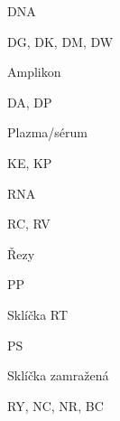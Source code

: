 \begin{appendix}
\begin{compactitem}
	\item DNA 
		\begin{compactitem}
			\item DG, DK, DM, DW
		\end{compactitem}

	\item Amplikon 
		\begin{compactitem}
			\item DA, DP
		\end{compactitem}

	\item Plazma/sérum 
		\begin{compactitem}
			\item KE, KP
		\end{compactitem}

	\item RNA 
		\begin{compactitem}
			\item RC, RV
		\end{compactitem}

	\item Řezy 
		\begin{compactitem}
			\item PP
		\end{compactitem}

	\item Sklíčka RT 
		\begin{compactitem}
			\item PS
		\end{compactitem}

	\item Sklíčka zamražená 
		\begin{compactitem}
			\item RY, NC, NR, BC
		\end{compactitem}
	\end{compactitem}


\end{appendix}
